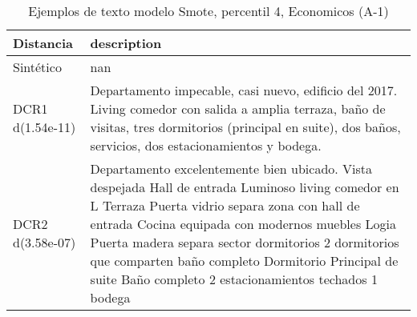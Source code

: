 \begin{table}[H]
\centering
\fontsize{10}{14}\selectfont
\caption{Ejemplos de texto modelo Smote, percentil 4, Economicos (A-1)}
\label{table-example-economicos-a-1-smote-enc-4p-text}
\begin{tabular}{|l|m{35em}|}
\hline
\rowcolor[gray]{0.8}
Distancia & description \\
\hline Sintético & nan \\
\hline DCR1 d(1.54e-11) & Departamento impecable, casi nuevo, edificio del 2017. Living comedor con salida a amplia terraza, ba\~no de visitas, tres dormitorios (principal en suite), dos ba\~nos, servicios, dos estacionamientos y bodega. \\
\hline DCR2 d(3.58e-07) & Departamento excelentemente bien ubicado. Vista despejada  Hall de entrada Luminoso living comedor en L Terraza Puerta vidrio separa zona con hall de entrada Cocina equipada con modernos muebles Logia Puerta madera separa sector dormitorios 2 dormitorios que comparten ba\~no completo Dormitorio Principal de suite Ba\~no completo  2 estacionamientos techados 1 bodega \\
\hline
\end{tabular}
\end{table}
